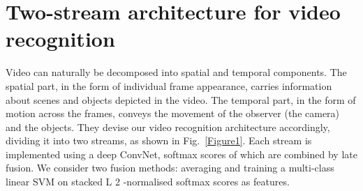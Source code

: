 \documentclass[10pt,twocolumn,letterpaper]{article}
\begin{document}
\section{Two-stream architecture for video recognition}
Video can naturally be decomposed into spatial and temporal components. The spatial part, in the form of individual frame appearance, carries information about scenes and objects depicted in the video. The temporal part, in the form of motion across the frames, conveys the movement of the
observer (the camera) and the objects. They devise our video recognition architecture accordingly, dividing it into two streams, as shown in Fig.~\ref{Figure1}. Each stream is implemented using a deep ConvNet,
softmax scores of which are combined by late fusion. We consider two fusion methods: averaging and training a multi-class linear SVM on stacked L 2 -normalised softmax scores as features.


\end{document}
